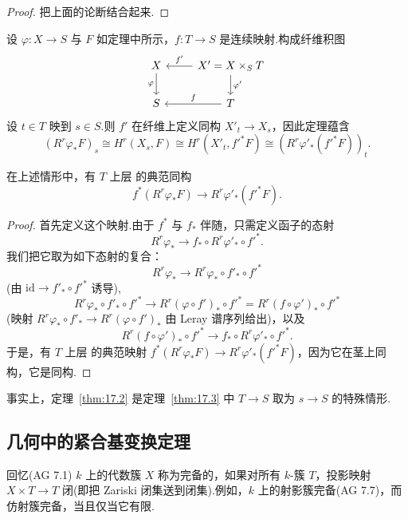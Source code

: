 \begin{proof}
把上面的论断结合起来.
\end{proof}

设 $\varphi \colon X \to S$ 与 $F$ 如定理中所示，$f \colon T \to S$ 是连续映射.构成纤维积图
\[
\begin{tikzcd}
X \arrow[d, "\varphi"'] & X' = X \times_{S} T \arrow[l, "f'"'] \arrow[d, "\varphi'"] \\
S & T \arrow[l, "f"']
\end{tikzcd}
\]
设 $t \in T$ 映到 $s \in S$.则 $f'$ 在纤维上定义同构 $X'_t \to X_s$，因此定理蕴含
\[
(R^{r}\varphi_{*}F)_s \cong H^{r}(X_s, F) \cong H^{r}(X'_t, f'^{*}F) \cong (R^{r}\varphi'_*(f'^{*}F))_t.
\]

\begin{theorem}\label{thm:17.3}
在上述情形中，有 $T$ 上层 的典范同构
\[
f^{*}(R^{r}\varphi_{*}F) \to R^{r}\varphi'_*(f'^{*}F).
\]
\end{theorem}

\begin{proof}
首先定义这个映射.由于 $f^{*}$ 与 $f_{*}$ 伴随，只需定义函子的态射
\[
R^{r}\varphi_{*} \to f_{*} \circ R^{r}\varphi'_* \circ f'^{*}.
\]
我们把它取为如下态射的复合：
\[
R^{r}\varphi_{*} \to R^{r}\varphi_{*} \circ f'_* \circ f'^{*}
\]
(由 $\mathrm{id} \to f'_* \circ f'^{*}$ 诱导),
\[
R^{r}\varphi_{*} \circ f'_* \circ f'^{*} \to R^{r}(\varphi \circ f')_* \circ f'^{*} = R^{r}(f \circ \varphi')_* \circ f'^{*}
\]
(映射 $R^{r}\varphi_{*} \circ f'_* \to R^{r}(\varphi \circ f')_*$ 由 Leray 谱序列给出)，以及
\[
R^{r}(f \circ \varphi')_* \circ f'^{*} \to f_{*} \circ R^{r}\varphi'_* \circ f'^{*}.
\]
于是，有 $T$ 上层 的典范映射 $f^{*}(R^{r}\varphi_{*}F) \to R^{r}\varphi'_*(f'^{*}F)$，因为它在茎上同构，它是同构.
\end{proof}

\begin{remark}\label{rem:17.4}
事实上，定理~\ref{thm:17.2} 是定理~\ref{thm:17.3} 中 $T \to S$ 取为 $s \to S$ 的特殊情形.
\end{remark}

\subsection*{几何中的紧合基变换定理}

回忆(AG 7.1) $k$ 上的代数簇 $X$ 称为完备的，如果对所有 $k$-簇 $T$，投影映射 $X \times T \to T$ 闭(即把 Zariski 闭集送到闭集).例如，$k$ 上的射影簇完备(AG 7.7)，而仿射簇完备，当且仅当它有限.


